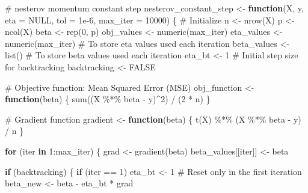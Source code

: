 \documentclass[
  letterpaper,
  DIV=11,
  numbers=noendperiod]{scrartcl}
\newenvironment{Shaded}{\begin{snugshade}}{\end{snugshade}}
\newcommand{\AttributeTok}[1]{\textcolor[rgb]{0.40,0.45,0.13}{#1}}
\newcommand{\CommentTok}[1]{\textcolor[rgb]{0.37,0.37,0.37}{#1}}
\newcommand{\ConstantTok}[1]{\textcolor[rgb]{0.56,0.35,0.01}{#1}}
\newcommand{\ControlFlowTok}[1]{\textcolor[rgb]{0.00,0.23,0.31}{\textbf{#1}}}
\newcommand{\DecValTok}[1]{\textcolor[rgb]{0.68,0.00,0.00}{#1}}
\newcommand{\FloatTok}[1]{\textcolor[rgb]{0.68,0.00,0.00}{#1}}
\newcommand{\FunctionTok}[1]{\textcolor[rgb]{0.28,0.35,0.67}{#1}}
\newcommand{\NormalTok}[1]{\textcolor[rgb]{0.00,0.23,0.31}{#1}}
\newcommand{\OtherTok}[1]{\textcolor[rgb]{0.00,0.23,0.31}{#1}}
\newcommand{\SpecialCharTok}[1]{\textcolor[rgb]{0.37,0.37,0.37}{#1}}
\begin{document}
\begin{Shaded}
\begin{Highlighting}[]
\CommentTok{\# nesterov momentum constant step}
\NormalTok{nesterov\_constant\_step }\OtherTok{\textless{}{-}} \ControlFlowTok{function}\NormalTok{(X, y, }\AttributeTok{eta =} \ConstantTok{NULL}\NormalTok{, }\AttributeTok{tol =} \FloatTok{1e{-}6}\NormalTok{, }\AttributeTok{max\_iter =} \DecValTok{10000}\NormalTok{) \{}
  \CommentTok{\# Initialize}
\NormalTok{  n }\OtherTok{\textless{}{-}} \FunctionTok{nrow}\NormalTok{(X)}
\NormalTok{  p }\OtherTok{\textless{}{-}} \FunctionTok{ncol}\NormalTok{(X)}
\NormalTok{  beta }\OtherTok{\textless{}{-}} \FunctionTok{rep}\NormalTok{(}\DecValTok{0}\NormalTok{, p)}
\NormalTok{  obj\_values }\OtherTok{\textless{}{-}} \FunctionTok{numeric}\NormalTok{(max\_iter)}
\NormalTok{  eta\_values }\OtherTok{\textless{}{-}} \FunctionTok{numeric}\NormalTok{(max\_iter)  }\CommentTok{\# To store eta values used each iteration}
\NormalTok{  beta\_values }\OtherTok{\textless{}{-}} \FunctionTok{list}\NormalTok{() }\CommentTok{\# To store beta values used each iteration}
\NormalTok{  eta\_bt }\OtherTok{\textless{}{-}} \DecValTok{1}  \CommentTok{\# Initial step size for backtracking}
\NormalTok{  backtracking }\OtherTok{\textless{}{-}} \ConstantTok{FALSE}
  
  \CommentTok{\# Objective function: Mean Squared Error (MSE)}
\NormalTok{  obj\_function }\OtherTok{\textless{}{-}} \ControlFlowTok{function}\NormalTok{(beta) \{}
    \FunctionTok{sum}\NormalTok{((X }\SpecialCharTok{\%*\%}\NormalTok{ beta }\SpecialCharTok{{-}}\NormalTok{ y)}\SpecialCharTok{\^{}}\DecValTok{2}\NormalTok{) }\SpecialCharTok{/}\NormalTok{ (}\DecValTok{2} \SpecialCharTok{*}\NormalTok{ n)}
\NormalTok{  \}}
  
  \CommentTok{\# Gradient function}
\NormalTok{  gradient }\OtherTok{\textless{}{-}} \ControlFlowTok{function}\NormalTok{(beta) \{}
    \FunctionTok{t}\NormalTok{(X) }\SpecialCharTok{\%*\%}\NormalTok{ (X }\SpecialCharTok{\%*\%}\NormalTok{ beta }\SpecialCharTok{{-}}\NormalTok{ y) }\SpecialCharTok{/}\NormalTok{ n}
\NormalTok{  \}}


  
  \ControlFlowTok{for}\NormalTok{ (iter }\ControlFlowTok{in} \DecValTok{1}\SpecialCharTok{:}\NormalTok{max\_iter) \{}
\NormalTok{    grad }\OtherTok{\textless{}{-}} \FunctionTok{gradient}\NormalTok{(beta)}
\NormalTok{    beta\_values[[iter]] }\OtherTok{\textless{}{-}}\NormalTok{ beta}
    
    \ControlFlowTok{if}\NormalTok{ (backtracking) \{}
      \ControlFlowTok{if}\NormalTok{ (iter }\SpecialCharTok{==} \DecValTok{1}\NormalTok{) eta\_bt }\OtherTok{\textless{}{-}} \DecValTok{1}  \CommentTok{\# Reset only in the first iteration}
\NormalTok{      beta\_new }\OtherTok{\textless{}{-}}\NormalTok{ beta }\SpecialCharTok{{-}}\NormalTok{ eta\_bt }\SpecialCharTok{*}\NormalTok{ grad}
      

\end{Highlighting}
\end{Shaded}
\end{document}
